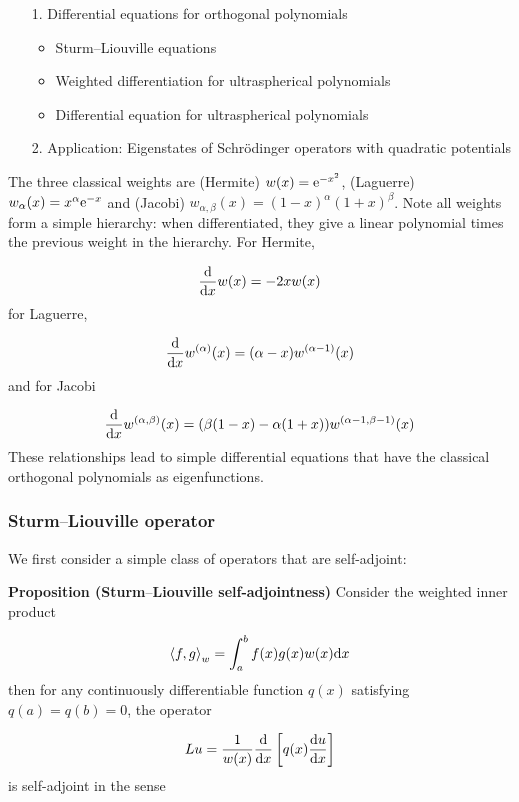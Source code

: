 \documentclass[12pt,a4paper]{article}
\def\D{ {\rm d} }
\def\E{ {\rm e} }
\def\ip<#1>{\left\langle{#1}\right\rangle}
\def\dx{\D x}
\def\endash{–}
\begin{document}
\begin{itemize}
\item[1. ] Differential equations for orthogonal polynomials

\begin{itemize}
\item Sturm\ensuremath{\endash}Liouville equations


\item Weighted differentiation for ultraspherical polynomials


\item Differential equation for ultraspherical polynomials

\end{itemize}

\item[2. ] Application: Eigenstates of Schrödinger operators with quadratic potentials

\end{itemize}
The three classical weights are (Hermite) $w(x) = \E^{-x^2}$, (Laguerre) $w_\alpha(x) = x^\alpha \E^{-x}$ and (Jacobi) $w_{\alpha,\beta}(x) = (1-x)^\alpha (1+x)^\beta$. Note all weights form a simple hierarchy: when differentiated, they give a linear polynomial times the previous weight in the hierarchy.  For Hermite,

\[
{\D \over \dx} w(x) = -2x w(x)
\]
for Laguerre,

\[
{\D \over \dx} w^{(\alpha)}(x) = (\alpha  - x) w^{(\alpha-1)}(x)
\]
and for Jacobi

\[
{\D \over \dx} w^{(\alpha,\beta)}(x) = (\beta(1-x) - \alpha(1+x)) w^{(\alpha-1,\beta-1)}(x)
\]
These relationships  lead to simple differential equations that have the classical orthogonal polynomials as eigenfunctions.

\subsubsection{Sturm\ensuremath{\endash}Liouville operator}
We first consider a simple class of operators that are self-adjoint:

\textbf{Proposition (Sturm\ensuremath{\endash}Liouville self-adjointness)} Consider the weighted inner product

\[
\ip<f,g>_w = \int_a^b f(x) g(x) w(x) \dx
\]
then for any continuously differentiable function $q(x)$ satisfying $q(a) = q(b) = 0$, the operator

\[
Lu = {1 \over w(x)} {\D \over \dx}\left[ q(x) {\D u\over \dx} \right]
\]
is self-adjoint in the sense
\end{document}
